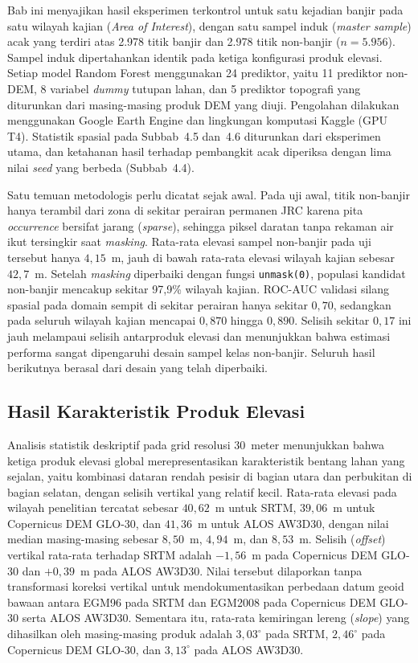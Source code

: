 \documentclass[12pt]{article}
\begin{document}
Bab ini menyajikan hasil eksperimen terkontrol untuk satu kejadian banjir pada
satu wilayah kajian (\textit{Area of Interest}), dengan satu sampel induk
(\textit{master sample}) acak yang terdiri atas 2.978 titik banjir dan 2.978
titik non-banjir ($n=5.956$). Sampel induk dipertahankan identik pada ketiga
konfigurasi produk elevasi. Setiap model Random Forest \cite{breiman2001}
menggunakan 24 prediktor, yaitu 11 prediktor non-DEM, 8 variabel
\textit{dummy} tutupan lahan, dan 5 prediktor topografi yang diturunkan dari
masing-masing produk DEM yang diuji. Pengolahan dilakukan menggunakan Google
Earth Engine dan lingkungan komputasi Kaggle (GPU T4). Statistik spasial pada
Subbab~4.5 dan~4.6 diturunkan dari eksperimen utama, dan ketahanan hasil
terhadap pembangkit acak diperiksa dengan lima nilai \textit{seed} yang
berbeda (Subbab~4.4).

Satu temuan metodologis perlu dicatat sejak awal. Pada uji awal, titik
non-banjir hanya terambil dari zona di sekitar perairan permanen JRC karena
pita \textit{occurrence} bersifat jarang (\textit{sparse}), sehingga piksel
daratan tanpa rekaman air ikut tersingkir saat \textit{masking}. Rata-rata
elevasi sampel non-banjir pada uji tersebut hanya $4{,}15$~m, jauh di bawah
rata-rata elevasi wilayah kajian sebesar $42{,}7$~m. Setelah \textit{masking}
diperbaiki dengan fungsi \texttt{unmask(0)}, populasi kandidat non-banjir
mencakup sekitar 97,9\% wilayah kajian. ROC-AUC validasi silang spasial pada
domain sempit di sekitar perairan hanya sekitar $0{,}70$, sedangkan pada
seluruh wilayah kajian mencapai $0{,}870$ hingga $0{,}890$. Selisih sekitar
$0{,}17$ ini jauh melampaui selisih antarproduk elevasi dan menunjukkan bahwa
estimasi performa sangat dipengaruhi desain sampel kelas non-banjir. Seluruh
hasil berikutnya berasal dari desain yang telah diperbaiki.

\subsection{Hasil Karakteristik Produk Elevasi}

Analisis statistik deskriptif pada grid resolusi 30~meter menunjukkan bahwa
ketiga produk elevasi global merepresentasikan karakteristik bentang lahan
yang sejalan, yaitu kombinasi dataran rendah pesisir di bagian utara dan
perbukitan di bagian selatan, dengan selisih vertikal yang relatif kecil.
Rata-rata elevasi pada wilayah penelitian tercatat sebesar $40{,}62$~m untuk
SRTM, $39{,}06$~m untuk Copernicus DEM GLO-30, dan $41{,}36$~m untuk ALOS
AW3D30, dengan nilai median masing-masing sebesar $8{,}50$~m, $4{,}94$~m, dan
$8{,}53$~m. Selisih (\textit{offset}) vertikal rata-rata terhadap SRTM adalah
$-1{,}56$~m pada Copernicus DEM GLO-30 dan $+0{,}39$~m pada ALOS AW3D30. Nilai
tersebut dilaporkan tanpa transformasi koreksi vertikal untuk
mendokumentasikan perbedaan datum geoid bawaan antara EGM96 pada SRTM dan
EGM2008 pada Copernicus DEM GLO-30 serta ALOS AW3D30. Sementara itu, rata-rata
kemiringan lereng (\textit{slope}) yang dihasilkan oleh masing-masing produk
adalah $3{,}03^{\circ}$ pada SRTM, $2{,}46^{\circ}$ pada Copernicus DEM GLO-30,
dan $3{,}13^{\circ}$ pada ALOS AW3D30.
\end{document}
